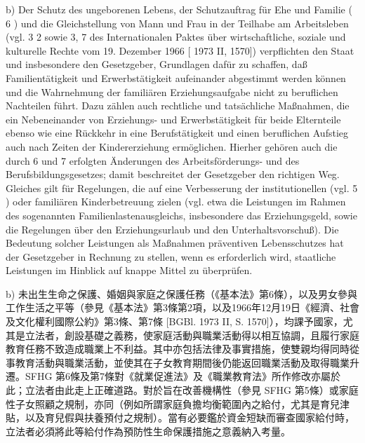 \documentclass[12pt]{article}
\begin{document}
\begin{sourcepara}[title={原文D.63}]
b) Der Schutz des ungeborenen Lebens, der Schutzauftrag für Ehe und Familie (\abbrArt{} 6 \abbrGG{}\ggfnArtSixDE{}) und die Gleichstellung von Mann und Frau in der Teilhabe am Arbeitsleben (vgl. \abbrArt{} 3 \abbrAbs{} 2 \abbrGG{}\ggfnArtThreeTwoDE{} sowie \abbrArt{} 3, 7 des Internationalen Paktes über wirtschaftliche, soziale und kulturelle Rechte vom 19. Dezember 1966 [\abbrBGBl{} 1973 II, \abbrS{} 1570]) verpflichten den Staat und insbesondere den Gesetzgeber, Grundlagen dafür zu schaffen, daß Familientätigkeit und Erwerbstätigkeit aufeinander abgestimmt werden können und die Wahrnehmung der familiären Erziehungsaufgabe nicht zu beruflichen Nachteilen führt. Dazu zählen auch rechtliche und tatsächliche Maßnahmen, die ein Nebeneinander von Erziehungs- und Erwerbstätigkeit für beide Elternteile ebenso wie eine Rückkehr in eine Berufstätigkeit und einen beruflichen Aufstieg auch nach Zeiten der Kindererziehung ermöglichen. Hierher gehören auch die durch \abbrArt{} 6 und 7 \abbrSFHG{} erfolgten Änderungen des Arbeitsförderungs- und des Berufsbildungsgesetzes; damit beschreitet der Gesetzgeber den richtigen Weg. Gleiches gilt für Regelungen, die auf eine Verbesserung der institutionellen (vgl. \abbrArt{} 5 \abbrSFHG{}) oder familiären Kinderbetreuung zielen (vgl. etwa die Leistungen im Rahmen des sogenannten Familienlastenausgleichs, insbesondere das Erziehungsgeld, sowie die Regelungen über den Erziehungsurlaub und den Unterhaltsvorschuß). Die Bedeutung solcher Leistungen als Maßnahmen präventiven Lebensschutzes hat der Gesetzgeber in Rechnung zu stellen, wenn es erforderlich wird, staatliche Leistungen im Hinblick auf knappe Mittel zu überprüfen.
\end{sourcepara}
\begin{transpara}
b) 未出生生命之保護、婚姻與家庭之保護任務（《基本法》第6條\ggfnArtSixZH{}），以及男女參與工作生活之平等（參見《基本法》第3條第2項\ggfnArtThreeTwoZH{}，以及1966年12月19日《經濟、社會及文化權利國際公約》第3條、第7條 [BGBl. 1973 II, S. 1570]），均課予國家，尤其是立法者，創設基礎之義務，使家庭活動與職業活動得以相互協調，且履行家庭教育任務不致造成職業上不利益。其中亦包括法律及事實措施，使雙親均得同時從事教育活動與職業活動，並使其在子女教育期間後仍能返回職業活動及取得職業升遷。SFHG 第6條及第7條對《就業促進法》及《職業教育法》所作修改亦屬於此；立法者由此走上正確道路。對於旨在改善機構性（參見 SFHG 第5條）或家庭性子女照顧之規制，亦同（例如所謂家庭負擔均衡範圍內之給付，尤其是育兒津貼，以及育兒假與扶養預付之規制）。當有必要鑑於資金短缺而審查國家給付時，立法者必須將此等給付作為預防性生命保護措施之意義納入考量。
\end{transpara}
\end{document}

